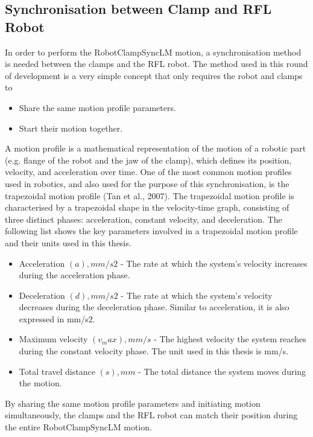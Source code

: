 \subsection{Synchronisation between Clamp and RFL Robot}
\label{subsection:exploration-2-synchronisation-between-clamp-and-rfl-robot}

In order to perform the RobotClampSyncLM motion, a synchronisation method is needed between the clamps and the RFL robot. The method used in this round of development is a very simple concept that only requires the robot and clamps to
\begin{itemize}
    \item Share the same motion profile parameters.
    \item Start their motion together.
\end{itemize}
    A motion profile is a mathematical representation of the motion of a robotic part (e.g. flange of the robot and the jaw of the clamp), which defines its position, velocity, and acceleration over time. One of the most common motion profiles used in robotics, and also used for the purpose of this synchronisation, is the trapezoidal motion profile (Tan et al., 2007).
The trapezoidal motion profile is characterised by a trapezoidal shape in the velocity-time graph, consisting of three distinct phases: acceleration, constant velocity, and deceleration. The following list shows the key parameters involved in a trapezoidal motion profile and their units used in this thesis.
\begin{itemize}
    \item Acceleration $(a), mm/s2$ - The rate at which the system's velocity increases during the acceleration phase. 
    \item Deceleration $(d), mm/s2$ - The rate at which the system's velocity decreases during the deceleration phase. Similar to acceleration, it is also expressed in mm/s2. 
    \item Maximum velocity $(v_max), mm/s$ - The highest velocity the system reaches during the constant velocity phase. The unit used in this thesis is mm/s. 
    \item Total travel distance $(s), mm$ - The total distance the system moves during the motion. 
\end{itemize}

By sharing the same motion profile parameters and initiating motion simultaneously, the clamps and the RFL robot can match their position during the entire RobotClampSyncLM motion.

